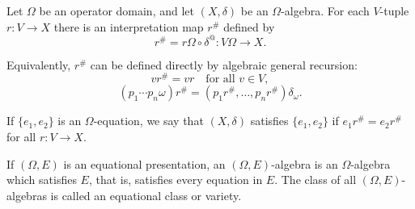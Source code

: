Let $\Omega$ be an operator domain, and let $(X, \delta)$ be an $\Omega$-algebra. For each $V$-tuple $r: V \longrightarrow X$ there is an interpretation map $r^\#$ defined by
$$r^\# = r\Omega \circ \delta^@ : V\Omega \longrightarrow X.$$

Equivalently, $r^\#$ can be defined directly by algebraic general recursion:
$$v r^\# = v r \quad \text{for all } v \in V,$$
$$(p_1 \cdots p_n \omega) r^\# = (p_1 r^\#, \ldots, p_n r^\#) \delta_\omega.$$

If $\{e_1, e_2\}$ is an $\Omega$-equation, we say that $(X, \delta)$ satisfies $\{e_1, e_2\}$ if $e_1 r^\# = e_2 r^\#$ for all $r: V \longrightarrow X$.

If $(\Omega, E)$ is an equational presentation, an $(\Omega, E)$-algebra is an $\Omega$-algebra which satisfies $E$, that is, satisfies every equation in $E$. The class of all $(\Omega, E)$-algebras is called an equational class or variety.
